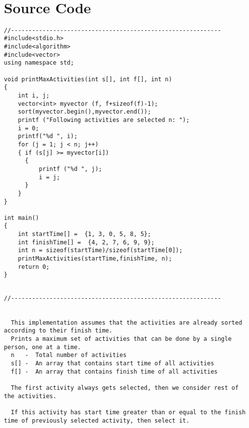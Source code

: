 \documentclass[14pt]{article}
\begin{document}
\\


\newpage
\section*{Source Code}
\begin{lstlisting}
//------------------------------------------------------------
#include<stdio.h>
#include<algorithm>
#include<vector>
using namespace std;

void printMaxActivities(int s[], int f[], int n)
{
    int i, j;
    vector<int> myvector (f, f+sizeof(f)-1);
    sort(myvector.begin(),myvector.end());
    printf ("Following activities are selected n: ");
    i = 0;
    printf("%d ", i);
    for (j = 1; j < n; j++)
    { if (s[j] >= myvector[i])
      {
          printf ("%d ", j);
          i = j;
      }
    }
}

int main()
{
    int startTime[] =  {1, 3, 0, 5, 8, 5};
    int finishTime[] =  {4, 2, 7, 6, 9, 9};
    int n = sizeof(startTime)/sizeof(startTime[0]);
    printMaxActivities(startTime,finishTime, n);
    return 0;
}


\end{lstlisting}
\begin{lstlisting}
//------------------------------------------------------------


  This implementation assumes that the activities are already sorted according to their finish time.
  Prints a maximum set of activities that can be done by a single person, one at a time.
  n   -  Total number of activities
  s[] -  An array that contains start time of all activities
  f[] -  An array that contains finish time of all activities

  The first activity always gets selected, then we consider rest of the activities.

  If this activity has start time greater than or equal to the finish time of previously selected activity, then select it.


\end{lstlisting}
\end{document}
